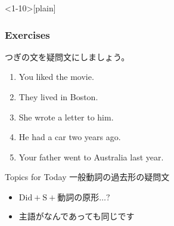\documentclass[handout,aspectratio=169,xcolor={dvipsnames,table}]{beamer}
\newcommand{\myaudio}[1]{\href{#1}{\faVolumeUp}}
\begin{document}
\begin{frame}<1-10>[plain]\frametitle{Exercises}

つぎの文を疑問文にしましょう。

 \begin{enumerate}
  \item<1-> You liked the movie.\hspace{59.7pt}
  \item<1-> They lived in Boston.\hspace{62pt}%
  \item<1-> She wrote a letter to him.\hspace{42pt}%
  \item<1-> He had  a car two years ago.\hspace{30.5pt}%
  \item<1-> Your father went to  Australia last year.\\
 \mbox{}\hfill{}
 \end{enumerate}

\begin{exampleblock}{Topics for Today}
\small
一般動詞の過去形の疑問文
\begin{itemize}
 \item  \textcolor{NavyBlue}{\bfseries $\text{Did} + \text{S} + \text{動詞の原形} \ldots ?$}
 \item  主語がなんであっても同じです
\end{itemize}
      \end{exampleblock}

\vspace{-10pt}
\mbox{}\hfill\myaudio{./audio/027_past_did_you_04.mp3}


\end{frame}
\end{document}
